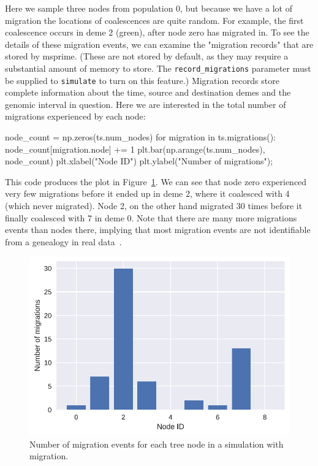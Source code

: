 \documentclass[graybox]{svmult}
\begin{document}
    Here we sample three nodes from population 0, but because we have a lot
of migration the locations of coalescences are quite random. For
example, the first coalescence occurs in deme 2 (green), after node zero
has migrated in. To see the details of these migration events, we can
examine the "migration records" that are stored by msprime. (These are
not stored by default, as they may require a substantial amount of
memory to store. The \texttt{record\_migrations} parameter must be
supplied to \texttt{simulate} to turn on this feature.) Migration
records store complete information about the time, source and
destination demes and the genomic interval in question. Here we are
interested in the total number of migrations experienced by each node:

\begin{pythoncode}
node_count = np.zeros(ts.num_nodes)
for migration in ts.migrations():
    node_count[migration.node] += 1
plt.bar(np.arange(ts.num_nodes), node_count)
plt.xlabel("Node ID")
plt.ylabel("Number of migrations");
\end{pythoncode}

This code produces the plot in Figure~\ref{fig:migration_counts}.
We can see that node zero experienced very few migrations before it
ended up in deme 2, where it coalesced with 4 (which never migrated).
Node 2, on the other hand migrated 30 times before it finally coalesced
with 7 in deme 0. Note that there are many more migrations events than
nodes there, implying that most migration events are not identifiable
from a genealogy in real data~\citep{sousa2011nonidentifiability}.

\begin{figure}
\begin{center}
\includegraphics[width=\textwidth]{images/simulations_30_0.pdf}
\end{center}
\caption{\label{fig:migration_counts} Number of migration events for
each tree node in a simulation with migration.}
\end{figure}
\end{document}

